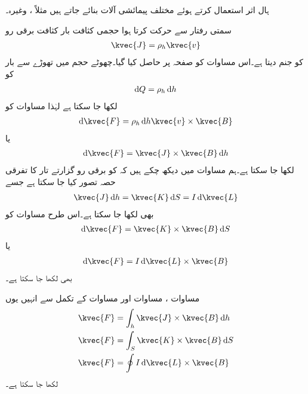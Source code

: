 ہال اثر استعمال کرتے ہوئے مختلف پیمائشی آلات بنائے جاتے ہیں مثلاً ،  وغیرہ۔

سمتی رفتار  سے حرکت کرتا ہوا حجمی کثافت بار   کثافت برقی رو 
\begin{align}
\kvec{J}=\rho_h \kvec{v}
\end{align}
کو جنم دیتا ہے۔اس مساوات کو صفحہ  پر حاصل کیا گیا۔چھوٹے حجم  میں تھوڑے سے بار کو
\begin{align}
\dif Q=\rho_h \dif h
\end{align}
لکھا جا سکتا ہے لہٰذا مساوات  کو
\begin{align*}
\dif \kvec{F}=\rho_h \dif h \kvec{v} \times \kvec{B}
\end{align*}
یا
\begin{align}\label{مساوات_امالہ_لورنز_تفرقی_الف}
\dif \kvec{F}=\kvec{J} \times \kvec{B} \dif h
\end{align}
لکھا جا سکتا ہے۔ہم مساوات  میں دیکھ چکے ہیں کہ  کو برقی رو گزارتے تار کا تفرقی حصہ تصور کیا جا سکتا ہے جسے 
\begin{align*}
\kvec{J} \dif h=\kvec{K} \dif S=I \dif \kvec{L}
\end{align*}
بھی لکھا جا سکتا ہے۔اس طرح مساوات  کو
\begin{align}\label{مساوات_امالہ_لورنز_تفرقی_ب}
\dif \kvec{F}=\kvec{K} \times \kvec{B} \dif S
\end{align}
یا 
\begin{align}\label{مساوات_امالہ_لورنز_تفرقی_پ}
\dif \kvec{F}=I \dif \kvec{L} \times \kvec{B}
\end{align}
بھی لکھا جا سکتا ہے۔

مساوات ، مساوات  اور مساوات  کے تکمل سے انہیں یوں
\begin{align}
\kvec{F}&=\int_h \kvec{J} \times \kvec{B} \dif h \label{مساوات_امالہ_لورنز_تتکمل_ت}\\
\kvec{F}&=\int_S \kvec{K} \times \kvec{B} \dif S \label{مساوات_امالہ_لورنز_تتکمل_ٹ}\\
\kvec{F}&=\oint I \dif \kvec{L} \times \kvec{B} \label{مساوات_امالہ_لورنز_تتکمل_پ}
\end{align}
لکھا جا سکتا ہے۔

